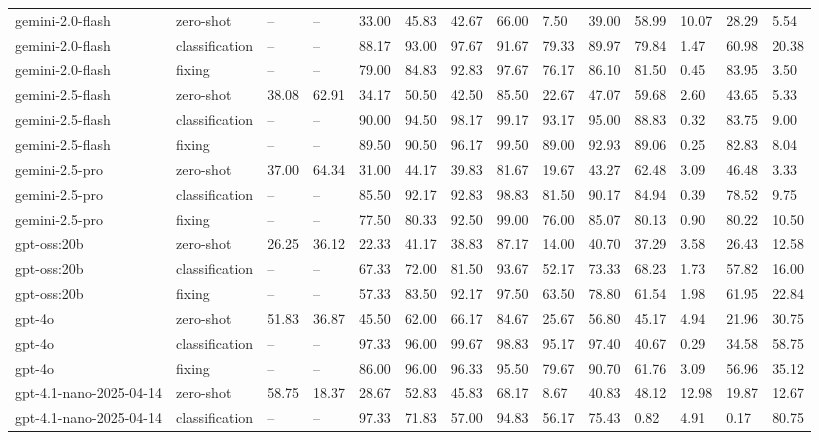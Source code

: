 \begin{table}[!t]
\begin{tabular}{llllllllllllll}
gemini-2.0-flash & zero-shot & -- & -- & 33.00 & 45.83 & 42.67 & 66.00 & 7.50 & 39.00 & 58.99 & 10.07 & 28.29 & 5.54 \\
gemini-2.0-flash & classification & -- & -- & 88.17 & 93.00 & 97.67 & 91.67 & 79.33 & 89.97 & 79.84 & 1.47 & 60.98 & 20.38 \\
gemini-2.0-flash & fixing & -- & -- & 79.00 & 84.83 & 92.83 & 97.67 & 76.17 & 86.10 & 81.50 & 0.45 & 83.95 & 3.50 \\
gemini-2.5-flash & zero-shot & 38.08 & 62.91 & 34.17 & 50.50 & 42.50 & 85.50 & 22.67 & 47.07 & 59.68 & 2.60 & 43.65 & 5.33 \\
gemini-2.5-flash & classification & -- & -- & 90.00 & 94.50 & 98.17 & 99.17 & 93.17 & 95.00 & 88.83 & 0.32 & 83.75 & 9.00 \\
gemini-2.5-flash & fixing & -- & -- & 89.50 & 90.50 & 96.17 & 99.50 & 89.00 & 92.93 & 89.06 & 0.25 & 82.83 & 8.04 \\
gemini-2.5-pro & zero-shot & 37.00 & 64.34 & 31.00 & 44.17 & 39.83 & 81.67 & 19.67 & 43.27 & 62.48 & 3.09 & 46.48 & 3.33 \\
gemini-2.5-pro & classification & -- & -- & 85.50 & 92.17 & 92.83 & 98.83 & 81.50 & 90.17 & 84.94 & 0.39 & 78.52 & 9.75 \\
gemini-2.5-pro & fixing & -- & -- & 77.50 & 80.33 & 92.50 & 99.00 & 76.00 & 85.07 & 80.13 & 0.90 & 80.22 & 10.50 \\
gpt-oss:20b & zero-shot & 26.25 & 36.12 & 22.33 & 41.17 & 38.83 & 87.17 & 14.00 & 40.70 & 37.29 & 3.58 & 26.43 & 12.58 \\
gpt-oss:20b & classification & -- & -- & 67.33 & 72.00 & 81.50 & 93.67 & 52.17 & 73.33 & 68.23 & 1.73 & 57.82 & 16.00 \\
gpt-oss:20b & fixing & -- & -- & 57.33 & 83.50 & 92.17 & 97.50 & 63.50 & 78.80 & 61.54 & 1.98 & 61.95 & 22.84 \\
gpt-4o & zero-shot & 51.83 & 36.87 & 45.50 & 62.00 & 66.17 & 84.67 & 25.67 & 56.80 & 45.17 & 4.94 & 21.96 & 30.75 \\
gpt-4o & classification & -- & -- & 97.33 & 96.00 & 99.67 & 98.83 & 95.17 & 97.40 & 40.67 & 0.29 & 34.58 & 58.75 \\
gpt-4o & fixing & -- & -- & 86.00 & 96.00 & 96.33 & 95.50 & 79.67 & 90.70 & 61.76 & 3.09 & 56.96 & 35.12 \\
gpt-4.1-nano-2025-04-14 & zero-shot & 58.75 & 18.37 & 28.67 & 52.83 & 45.83 & 68.17 & 8.67 & 40.83 & 48.12 & 12.98 & 19.87 & 12.67 \\
gpt-4.1-nano-2025-04-14 & classification & -- & -- & 97.33 & 71.83 & 57.00 & 94.83 & 56.17 & 75.43 & 0.82 & 4.91 & 0.17 & 80.75 \\

\end{tabular}
\end{table}
